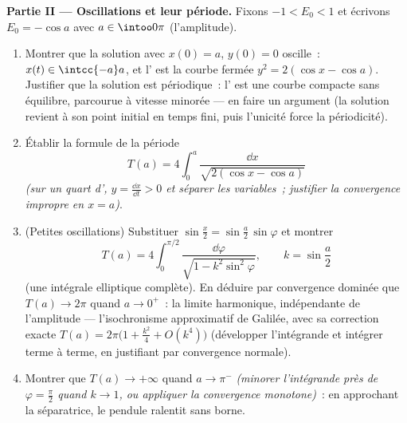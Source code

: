 \begin{problem}
\medskip
\noindent\textbf{Partie II --- Oscillations et leur
période.}
Fixons $-1 < E_0 < 1$ et écrivons $E_0 = -\cos a$ avec $a \in
\intoo0\pi$ (l'amplitude).
\begin{enumerate}[resume]
  \item Montrer que la solution avec $x(0) = a$, $y(0) = 0$
        oscille~: $x(t) \in \intcc{-a}a$, et l' est la
        courbe fermée $y^2 = 2(\cos x - \cos a)$. Justifier
        que la solution est périodique~: l' est une
        courbe compacte sans équilibre, parcourue à vitesse
        minorée --- en faire un argument (la solution revient
        à son point initial en temps fini, puis l'unicité
        force la périodicité).
  \item Établir la formule de la période
        \[
        T(a) = 4\int_0^{a}\frac{\dd x}{\sqrt{2(\cos x -
        \cos a)}}
        \]
        \emph{(sur un quart d', $y = \frac{\dd x}{\dd t}
        > 0$ et séparer les variables~; justifier la
        convergence impropre en $x = a$)}.
  \item (Petites oscillations) Substituer $\sin\frac x2 =
        \sin\frac a2\,\sin\varphi$ et montrer
        \[
        T(a) = 4\int_0^{\pi/2}\frac{\dd\varphi}{\sqrt{1 -
        k^2\sin^2\varphi}},
        \qquad k = \sin\frac a2
        \]
        (une intégrale elliptique complète). En déduire par
        convergence dominée que $T(a) \to 2\pi$ quand $a \to
        0^+$~: la limite harmonique, indépendante de
        l'amplitude --- l'isochronisme approximatif de
        Galilée, avec sa correction exacte $T(a) =
        2\pi\bigl(1 + \frac{k^2}4 + O(k^4)\bigr)$
        (développer l'intégrande et intégrer terme à terme,
        en justifiant par convergence normale).
  \item Montrer que $T(a) \to +\infty$ quand $a \to \pi^-$
        \emph{(minorer l'intégrande près de $\varphi =
        \frac\pi2$ quand $k \to 1$, ou appliquer la
        convergence monotone)}~: en approchant la
        séparatrice, le pendule ralentit sans borne.
\end{enumerate}


\end{problem}
